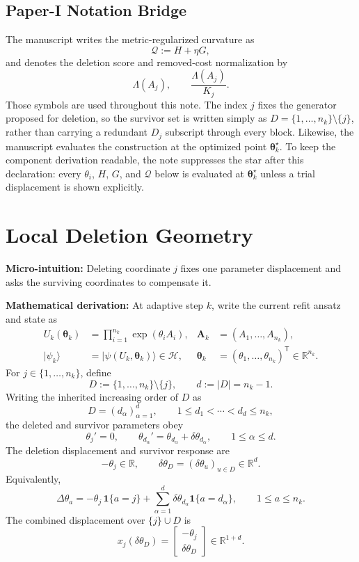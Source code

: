 \documentclass[10pt,twocolumn]{article}
\newcommand{\ket}[1]{|#1\rangle}
\newcommand{\blocktitle}[1]{\vspace{2pt}\noindent\textbf{#1}\space}
\newcommand{\micro}[1]{\blocktitle{Micro-intuition:} #1}
\newcommand{\deriv}{\blocktitle{Mathematical derivation:}}
\begin{document}
\subsection*{Paper-I Notation Bridge}

The manuscript writes the metric-regularized curvature as
\[
\mathcal Q:=H+\eta G,
\]
and denotes the deletion score and removed-cost normalization by
\[
\Lambda(A_j),
\qquad
\frac{\Lambda(A_j)}{K_j}.
\]
Those symbols are used throughout this note. The index \(j\) fixes the generator proposed for deletion, so the survivor set is written simply as \(D=\{1,\ldots,n_k\}\setminus\{j\}\), rather than carrying a redundant \(D_j\) subscript through every block. Likewise, the manuscript evaluates the construction at the optimized point \(\boldsymbol\theta_k^\star\). To keep the component derivation readable, the note suppresses the star after this declaration: every \(\theta_i\), \(H\), \(G\), and \(\mathcal Q\) below is evaluated at \(\boldsymbol\theta_k^\star\) unless a trial displacement is shown explicitly.

\section*{Local Deletion Geometry}

\micro{Deleting coordinate \(j\) fixes one parameter displacement and asks the surviving coordinates to compensate it.}

\deriv
At adaptive step \(k\), write the current refit ansatz and state as
\[
\begin{aligned}
U_k(\boldsymbol\theta_k)
&=
\prod_{i=1}^{n_k}\exp(\theta_iA_i),
&
\mathbf A_k&=(A_1,\ldots,A_{n_k}),
\\
\ket{\psi_k}
&=
\ket{\psi(U_k,\boldsymbol\theta_k)}\in\mathcal H,
&
\boldsymbol\theta_k&=(\theta_1,\ldots,\theta_{n_k})^{\mathsf T}\in\mathbb R^{n_k}.
\end{aligned}
\]
For \(j\in\{1,\ldots,n_k\}\), define
\[
D:=\{1,\ldots,n_k\}\setminus\{j\},
\qquad
d:=|D|=n_k-1.
\]
Writing the inherited increasing order of \(D\) as
\[
D=(d_\alpha)_{\alpha=1}^{d},
\qquad
1\le d_1<\cdots<d_d\le n_k ,
\]
the deleted and survivor parameters obey
\[
\theta_j'=0,
\qquad
\theta_{d_\alpha}'=\theta_{d_\alpha}+\delta\theta_{d_\alpha},
\qquad
1\le\alpha\le d.
\]
The deletion displacement and survivor response are
\[
-\theta_j\in\mathbb R,
\qquad
\delta\theta_D=(\delta\theta_u)_{u\in D}\in\mathbb R^d.
\]
Equivalently,
\[
\Delta\theta_a
=
-\theta_j\,\mathbf 1\{a=j\}
+
\sum_{\alpha=1}^{d}\delta\theta_{d_\alpha}\mathbf 1\{a=d_\alpha\},
\qquad
1\le a\le n_k .
\]
The combined displacement over \(\{j\}\cup D\) is
\[
x_j(\delta\theta_D)
=
\begin{bmatrix}
-\theta_j\\
\delta\theta_D
\end{bmatrix}
\in\mathbb R^{1+d}.
\]
\end{document}
